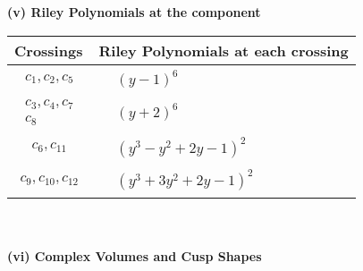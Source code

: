 \documentclass[1p]{elsarticle_modified}
\theoremstyle{definition}
\begin{document}
\newpage\renewcommand{\arraystretch}{1}
\flushleft \textbf{(v) Riley Polynomials at the component}\newline \\
\begin{tabular}{m{50pt}|m{274pt}}
Crossings & \hspace{64pt}Riley Polynomials at each crossing \\
\hline $$\begin{aligned}c_{1},c_{2},c_{5}\end{aligned}$$&$\begin{aligned}
&(y-1)^6
\end{aligned}$\\
\hline $$\begin{aligned}c_{3},c_{4},c_{7}\\c_{8}\end{aligned}$$&$\begin{aligned}
&(y+2)^6
\end{aligned}$\\
\hline $$\begin{aligned}c_{6},c_{11}\end{aligned}$$&$\begin{aligned}
&(y^3- y^2+2 y-1)^2
\end{aligned}$\\
\hline $$\begin{aligned}c_{9},c_{10},c_{12}\end{aligned}$$&$\begin{aligned}
&(y^3+3 y^2+2 y-1)^2
\end{aligned}$\\
\hline
\end{tabular}\\~\\
\newpage\flushleft \textbf{(vi) Complex Volumes and Cusp Shapes}
\end{document}
